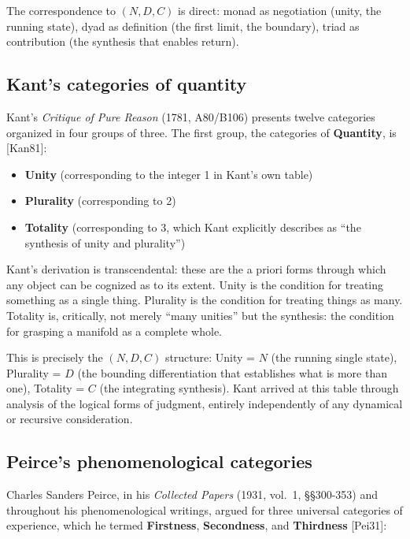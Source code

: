 \documentclass[12pt]{article}
\providecommand{\tightlist}{%
  \setlength{\itemsep}{0pt}\setlength{\parskip}{0pt}}
\begin{document}
The correspondence to \((N, D, C)\) is direct: monad as negotiation
(unity, the running state), dyad as definition (the first limit, the
boundary), triad as contribution (the synthesis that enables return).

\subsection{Kant's categories of quantity}\label{kants-categories-of-quantity}

Kant's \emph{Critique of Pure Reason} (1781, A80/B106) presents twelve
categories organized in four groups of three. The first group, the
categories of \textbf{Quantity}, is {[}Kan81{]}:

\begin{itemize}
\tightlist
\item
  \textbf{Unity} (corresponding to the integer 1 in Kant's own table)
\item
  \textbf{Plurality} (corresponding to 2)
\item
  \textbf{Totality} (corresponding to 3, which Kant explicitly describes
  as ``the synthesis of unity and plurality'')
\end{itemize}

Kant's derivation is transcendental: these are the a priori forms
through which any object can be cognized as to its extent. Unity is the
condition for treating something as a single thing. Plurality is the
condition for treating things as many. Totality is, critically, not
merely ``many unities'' but the synthesis: the condition for grasping a
manifold as a complete whole.

This is precisely the \((N, D, C)\) structure: Unity = \(N\) (the
running single state), Plurality = \(D\) (the bounding differentiation
that establishes what is more than one), Totality = \(C\) (the
integrating synthesis). Kant arrived at this table through analysis of
the logical forms of judgment, entirely independently of any dynamical
or recursive consideration.

\subsection{Peirce's phenomenological categories}\label{peirces-phenomenological-categories}

Charles Sanders Peirce, in his \emph{Collected Papers} (1931, vol.~1,
§§300-353) and throughout his phenomenological writings, argued for
three universal categories of experience, which he termed
\textbf{Firstness}, \textbf{Secondness}, and \textbf{Thirdness}
{[}Pei31{]}:
\end{document}
